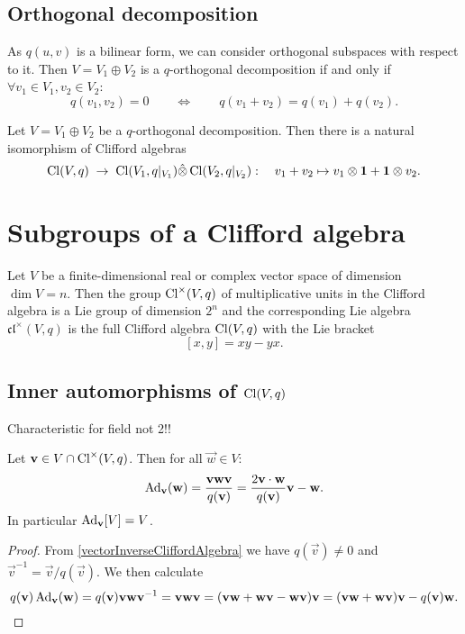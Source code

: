 \subsection{Orthogonal decomposition}
As $q(u,v)$ is a bilinear form, we can consider orthogonal subspaces with respect to it. Then $V=V_1\oplus V_2$ is a $q$-orthogonal decomposition if and only if $\forall v_1\in V_1, v_2\in V_2$:
\[ q(v_1,v_2) = 0 \qquad \iff \qquad q(v_1+v_2) = q(v_1) + q(v_2). \]
\begin{proposition}
Let $V=V_1\oplus V_2$ be a $q$-orthogonal decomposition. Then there is a natural isomorphism of Clifford algebras
\[ \operatorname{Cl}(V,q) \;\to\; \operatorname{Cl}(V_1,q|_{V_1}) \hat{\otimes} \operatorname{Cl}(V_2, q|_{V_2}):\quad v_1+v_2\mapsto v_1\otimes \boldsymbol{\mathrm{1}} + \boldsymbol{\mathrm{1}}\otimes v_2. \]
\end{proposition}

\section{Subgroups of a Clifford algebra}

\begin{proposition}
Let $V$ be a finite-dimensional real or complex vector space of dimension $\dim V = n$. Then the group $\operatorname{Cl}^\times(V,q)$ of multiplicative units in the Clifford algebra is a Lie group of dimension $2^n$ and the corresponding Lie algebra $\mathfrak{cl}^\times(V,q)$ is the full Clifford algebra $\operatorname{Cl}(V,q)$ with the Lie bracket
\[ [x,y] = xy - yx.  \]
\end{proposition}

\subsection{Inner automorphisms of $\operatorname{Cl}(V,q)$}
Characteristic for field not 2!!


\begin{proposition} \label{AdOrthogonalDecomposition}
Let $\boldsymbol{\mathrm{v}}\in V\cap \operatorname{Cl}^\times(V,q)$. Then for all $\vec{w}\in V$:
\[ \operatorname{Ad}_{\boldsymbol{\mathrm{v}}}(\boldsymbol{\mathrm{w}}) = \frac{\boldsymbol{\mathrm{v}}\boldsymbol{\mathrm{w}}\boldsymbol{\mathrm{v}}}{q(\boldsymbol{\mathrm{v}})} = \frac{2\boldsymbol{\mathrm{v}}\cdot\boldsymbol{\mathrm{w}}}{q(\boldsymbol{\mathrm{v}})}\boldsymbol{\mathrm{v}} - \boldsymbol{\mathrm{w}}. \]
In particular $\operatorname{Ad}_{\boldsymbol{\mathrm{v}}}[V] = V$.
\end{proposition}
\begin{proof}
From \ref{vectorInverseCliffordAlgebra} we have $q(\vec{v})\neq 0$ and $\vec{v}^{-1} = \vec{v}/q(\vec{v})$.
We then calculate
\[ q(\boldsymbol{\mathrm{v}})\operatorname{Ad}_{\boldsymbol{\mathrm{v}}}(\boldsymbol{\mathrm{w}}) = q(\boldsymbol{\mathrm{v}})\boldsymbol{\mathrm{v}}\boldsymbol{\mathrm{w}}\boldsymbol{\mathrm{v}}^{-1} = \boldsymbol{\mathrm{v}}\boldsymbol{\mathrm{w}}\boldsymbol{\mathrm{v}} = (\boldsymbol{\mathrm{v}}\boldsymbol{\mathrm{w}} + \boldsymbol{\mathrm{w}}\boldsymbol{\mathrm{v}} - \boldsymbol{\mathrm{w}}\boldsymbol{\mathrm{v}})\boldsymbol{\mathrm{v}} = (\boldsymbol{\mathrm{v}}\boldsymbol{\mathrm{w}}+\boldsymbol{\mathrm{w}}\boldsymbol{\mathrm{v}})\boldsymbol{\mathrm{v}} - q(\boldsymbol{\mathrm{v}})\boldsymbol{\mathrm{w}}. \]
\end{proof}

